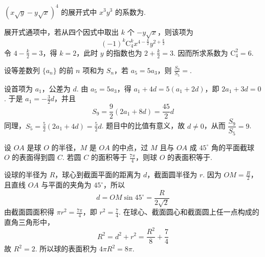 \begin{problem}
\(\left(x\sqrt{y} - y\sqrt{x}\right)^4\) 的展开式中 \(x^3 y^3\) 的系数为\fillinblank{}.

\begin{solution}
展开式通项中，若从四个因式中取出 \(k\) 个 \(-y\sqrt{x}\)，则该项为
\[
(-1)^k\mathrm C_4^k x^{4-\frac{k}{2}}y^{2+\frac{k}{2}}
\]
令 \(4-\frac{k}{2}=3\)，得 \(k=2\)，此时 \(y\) 的指数也为 \(2+\frac{k}{2}=3\). 因而所求系数为 \(\mathrm C_4^2=6\).
\end{solution}
\end{problem}

\begin{problem}
设等差数列 \(\{a_{n}\}\) 的前 \(n\) 项和为 \(S_{n}\)，若 \(a_{5} = 5a_{3}\)，则 \(\frac{S_{9}}{S_{5}} = \)\fillinblank{}.

\begin{solution}
设首项为 \(a_{1}\)，公差为 \(d\). 由 \(a_{5}=5a_{3}\)，得 \(a_{1}+4d=5(a_{1}+2d)\)，即 \(2a_{1}+3d=0\).
于是 \(a_{1}=-\frac32d\)，并且
\[
S_{9}=\frac92(2a_{1}+8d)=\frac{45}{2}d
\]
同理，\(S_{5}=\frac52(2a_{1}+4d)=\frac{5}{2}d\).
题目中的比值有意义，故 \(d\ne0\)，从而 \(\dfrac{S_{9}}{S_{5}}=9\).
\end{solution}
\end{problem}

\begin{problem}
设 \(OA\) 是球 \(O\) 的半径，\(M\) 是 \(OA\) 的中点，过 \(M\) 且与 \(OA\) 成 \(45^{\circ}\) 角的平面截球 \(O\) 的表面得到圆 \(C\). 若圆 \(C\) 的面积等于 \(\frac{7\pi}{4}\)，则球 \(O\) 的表面积等于\fillinblank{}.
\answer{\(8\pi\)}

\begin{solution}
设球的半径为 \(R\)，球心到截面平面的距离为 \(d\)，截面圆半径为 \(r\). 因为 \(OM=\frac{R}{2}\)，且直线 \(OA\) 与平面的夹角为 \(45^{\circ}\)，所以
\[
d=OM\sin45^{\circ}=\frac{R}{2\sqrt2}
\]
由截面圆面积得 \(\pi r^{2}=\frac{7\pi}{4}\)，即 \(r^{2}=\frac74\). 在球心、截面圆心和截面圆上任一点构成的直角三角形中，
\[
R^{2}=d^{2}+r^{2}=\frac{R^{2}}8+\frac74
\]
故 \(R^{2}=2\). 所以球的表面积为 \(4\pi R^{2}=8\pi\).
\end{solution}
\end{problem}


